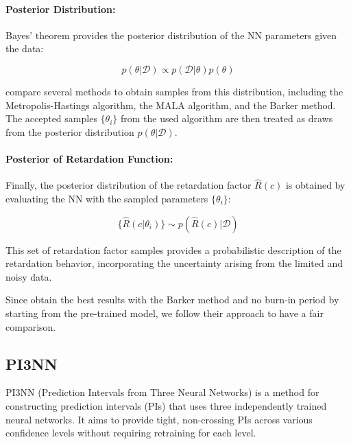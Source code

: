\paragraph{Posterior Distribution:}

Bayes' theorem provides the posterior distribution of the NN parameters given the data:

\begin{equation*}
p(\theta | \mathcal{D}) \propto p(\mathcal{D} | \theta) p(\theta)
\end{equation*}

\cite{finn} compare several methods to obtain samples from this distribution, including the Metropolis-Hastings algorithm, the MALA algorithm, and the Barker method. The accepted samples $\{\theta_i\}$ from the used algorithm are then treated as draws from the posterior distribution $p(\theta | \mathcal{D})$.

\paragraph{Posterior of Retardation Function:}

Finally, the posterior distribution of the retardation factor $\hat{R}(c)$ is obtained by evaluating the NN with the sampled parameters $\{\theta_i\}$:

\begin{equation*}
\{\hat{R}(c | \theta_i)\} \sim p(\hat{R}(c) | \mathcal{D})
\end{equation*}

This set of retardation factor samples provides a probabilistic description of the retardation behavior, incorporating the uncertainty arising from the limited and noisy data.

Since \cite{finn} obtain the best results with the Barker method and no burn-in period by starting from the pre-trained model, we follow their approach to have a fair comparison.



\subsection{PI3NN}
PI3NN (Prediction Intervals from Three Neural Networks) \cite{pi3nn} is a method for constructing prediction intervals (PIs) that uses three independently trained neural networks. It aims to provide tight, non-crossing PIs across various confidence levels without requiring retraining for each level.

